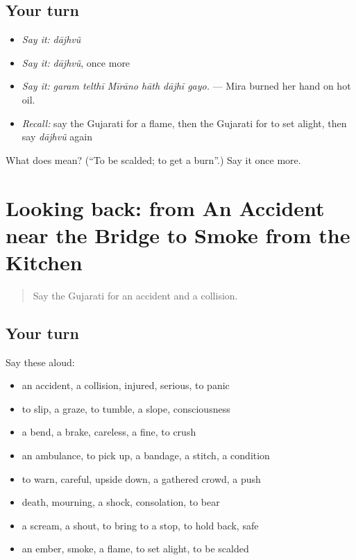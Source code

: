\subsection*{Your turn}
\begin{itemize}
\raggedright
  \item \emph{Say it:} \emph{dājhvũ}
  \item \emph{Say it:} \emph{dājhvũ}, once more
  \item \emph{Say it:} \emph{garam telthī Mīrāno hāth dājhī gayo.} — Mira burned her hand on hot oil.
  \item \emph{Recall:} say the Gujarati for a flame, then the Gujarati for to set alight, then say \emph{dājhvũ} again
\end{itemize}

\begin{tcolorbox}[breakable,colback=teal!4,colframe=teal!35!black,title={Before you move on}]
What does  mean? (\textquotedblleft{}To be scalded; to get a burn\textquotedblright{}.) Say it once more.
\end{tcolorbox}
\section[(dialogue)]{Looking back: from An Accident near the Bridge to Smoke from the Kitchen}

\label{lesson:GU-R300-review-293-300}



\begin{quote}
Say the Gujarati for an accident and a collision.
\end{quote}

\subsection*{Your turn}
Say these aloud:

\begin{itemize}
\raggedright
  \item an accident, a collision, injured, serious, to panic
  \item to slip, a graze, to tumble, a slope, consciousness
  \item a bend, a brake, careless, a fine, to crush
  \item an ambulance, to pick up, a bandage, a stitch, a condition
  \item to warn, careful, upside down, a gathered crowd, a push
  \item death, mourning, a shock, consolation, to bear
  \item a scream, a shout, to bring to a stop, to hold back, safe
  \item an ember, smoke, a flame, to set alight, to be scalded
\end{itemize}

